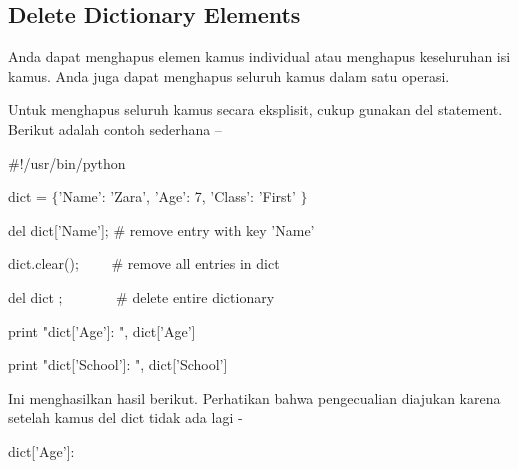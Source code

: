 \documentclass[a4paper,12pt]{report}
\begin{document}
\subsection*{Delete Dictionary Elements}
 \par
\begin{adjustwidth}{0.03in}{0.03in}
Anda dapat menghapus elemen kamus individual atau menghapus keseluruhan isi kamus. Anda juga dapat menghapus seluruh kamus dalam satu operasi.\end{adjustwidth}
 \par
\begin{adjustwidth}{0.03in}{0.03in}
Untuk menghapus seluruh kamus secara eksplisit, cukup gunakan del statement. Berikut adalah contoh sederhana –\end{adjustwidth}
 \par
\vspace{12pt}
\noindent 
 \hspace*{0.5in}  $  \#  $!/usr/bin/python \par
\vspace{12pt}
\noindent 
 \hspace*{0.5in} dict =  $  \{  $'Name': 'Zara', 'Age': 7, 'Class': 'First' $  \}  $ \par
\vspace{12pt}
\noindent 
 \hspace*{0.5in} del dict['Name'];  $  \#  $ remove entry with key 'Name' \par
\noindent 
 \hspace*{0.5in} dict.clear();~~~~  $  \#  $ remove all entries in dict \par
\noindent 
 \hspace*{0.5in} del dict ;~~~~~~~  $  \#  $ delete entire dictionary \par
\vspace{12pt}
\noindent 
 \hspace*{0.5in} print "dict['Age']: ", dict['Age'] \par
\noindent 
 \hspace*{0.5in} print "dict['School']: ", dict['School'] \par
\begin{adjustwidth}{0.03in}{0.03in}
Ini menghasilkan hasil berikut. Perhatikan bahwa pengecualian diajukan karena setelah kamus del dict tidak ada lagi -\end{adjustwidth}
 \par
\noindent 
{\fontsize{9pt}{9pt}\selectfont  \hspace*{0.5in} dict['Age']:} \par
\end{document}

